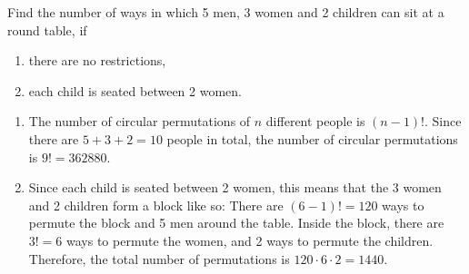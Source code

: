 \begin{question}
    Find the number of ways in which 5 men, 3 women and 2 children can sit at a
    round table, if 
    \begin{enumerate}
        \item there are no restrictions,
        
        \item each child is seated between 2 women.
    \end{enumerate}
\end{question}
\begin{solution}
    \begin{enumerate}
        \item The number of circular permutations of $n$ different people is
            $(n - 1)!$. Since there are $5 + 3 + 2 = 10$ people in total, the
            number of circular permutations is $9! = 362880$.

        \item Since each child is seated between 2 women, this means that the 3
            women and 2 children form a block like so:
            There are $(6 - 1)! = 120$ ways to permute the block and 5 men around
            the table. Inside the block, there are $3! = 6$ ways to permute the
            women, and 2 ways to permute the children. Therefore, the total number
            of permutations is $120 \cdot 6 \cdot 2 = 1440$.
    \end{enumerate}
\end{solution}

